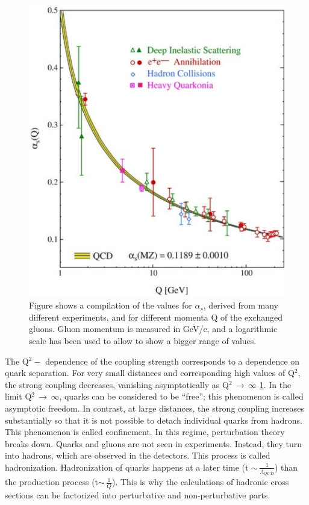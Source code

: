 \begin{figure}
  \includegraphics[width=\largefigwidth]{chap_SMAndQGP_figures/QCDAlpha_Prog}
  \caption[]{Figure shows a compilation of the values for $\alpha_s$, derived from many different experiments, and for different momenta Q of 
    the exchanged gluons. Gluon momentum is measured in GeV/c, and a logarithmic scale has been used to allow to show a bigger range of 
    values.}
  \label{fig:QCDAlpha}
\end{figure}



The Q$^2-$ dependence of the coupling strength corresponds to a dependence on quark
separation. For very small distances and corresponding high values of Q$^2$, the strong
coupling decreases, vanishing asymptotically as Q$^2\,\rightarrow\,\infty$ \ref{fig:QCDAlpha}. 
In the limit Q$^2\,\rightarrow\,\infty$, quarks
can be considered to be ``free''; this phenomenon is called asymptotic freedom. In
contrast, at large distances, the strong coupling increases substantially so that it is
not possible to detach individual quarks from hadrons. This phenomenon is called
confinement. In this regime, perturbation theory breaks down.
Quarks and gluons are not seen in experiments. Instead, they turn into hadrons,
which are observed in the detectors. This process is called hadronization. Hadronization
of quarks happens at a later time (t $\sim\,\frac{1}{\Lambda_{QCD}}$)
than the production process (t$\sim\,\frac{1}{Q}$). This is why the calculations 
of hadronic cross sections can be factorized into perturbative and non-perturbative parts.


